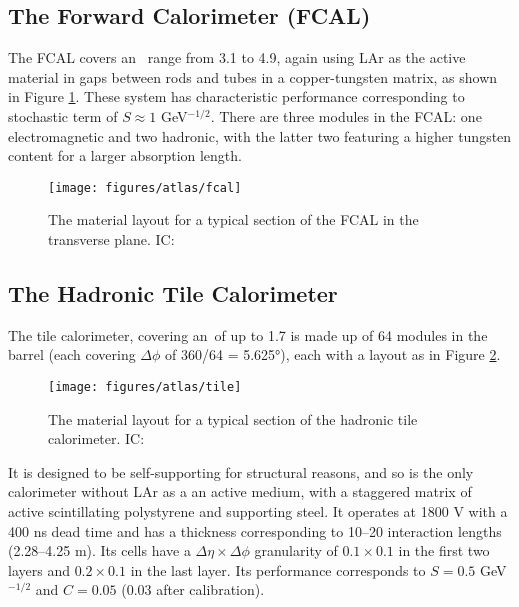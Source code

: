 \subsection{The Forward Calorimeter (FCAL)}
The FCAL covers an \aeta\, range from 3.1 to 4.9, again using LAr as the active material in gaps between rods and tubes in a copper-tungsten matrix, as shown in Figure \ref{fig:fcal}.  These system has characteristic performance corresponding to stochastic term of $S\approx1$ GeV$^{-1/2}$.  There are three modules in the FCAL: one electromagnetic and two hadronic, with the latter two featuring a higher tungsten content for a larger absorption length.

\begin{figure}[!htbp]\captionsetup{justification=centering}
  \centering
  \texttt{[image: figures/atlas/fcal]}
  \caption{The material layout for a typical section of the FCAL in the transverse plane.  IC: \cite{jinstpaper}}
  \label{fig:fcal}
\end{figure}

\subsection{The Hadronic Tile Calorimeter}
The tile calorimeter, covering an \aeta\,of up to 1.7 is made up of 64 modules in the barrel (each covering $\Delta\phi$ of 360/64 = \ang{5.625}), each with a layout as in Figure \ref{fig:tile}.  
\begin{figure}[!htbp]\captionsetup{justification=centering}
  \centering
  \texttt{[image: figures/atlas/tile]}
  \caption{The material layout for a typical section of the hadronic tile calorimeter.  IC: \cite{jinstpaper}}
  \label{fig:tile}
\end{figure}
It is designed to be self-supporting for structural reasons, and so is the only calorimeter without LAr as a an active medium, with a staggered matrix of active scintillating polystyrene and supporting steel.  It operates at 1800 V with a 400 ns dead time and has a thickness corresponding to 10--20 interaction lengths (2.28--4.25 m).  Its cells have a $\Delta\eta\times\Delta\phi$ granularity of $0.1\times0.1$ in the first two layers and $0.2\times0.1$ in the last layer.  Its performance corresponds to $S=0.5$ GeV$^{-1/2}$ and $C=0.05$ (0.03 after calibration).


